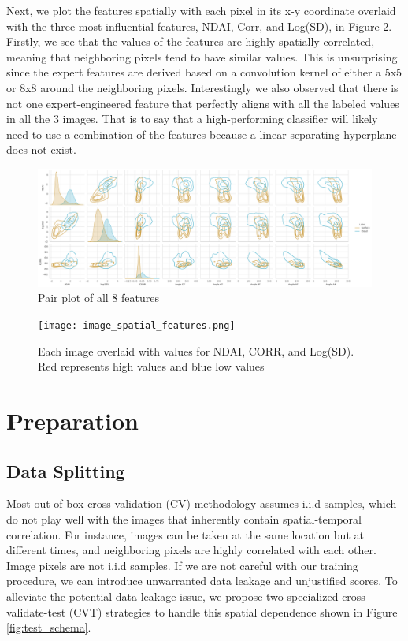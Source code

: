 \documentclass[11pt, letterpaper, journal]{IEEEtran}
\begin{document}
Next, we plot the features spatially with each pixel in its x-y coordinate overlaid with the three most influential features, NDAI, Corr, and Log(SD), in Figure \ref{fig:spatial_dist_covariates}. Firstly, we see that the values of the features are highly spatially correlated, meaning that neighboring pixels tend to have similar values. This is unsurprising since the expert features are derived based on a convolution kernel of either a 5x5 or 8x8 around the neighboring pixels. Interestingly we also observed that there is not one expert-engineered feature that perfectly aligns with all the labeled values in all the 3 images. That is to say that a high-performing classifier will likely need to use a combination of the features because a linear separating hyperplane does not exist.

\begin{figure}[!h]
\centering
\includegraphics[width=1.04\textwidth]{2.c.png}
\caption{Pair plot of all 8 features}
\label{fig:covariate_pairplot}
\end{figure}

\begin{figure}[!h]
\centering
\texttt{[image: image\_spatial\_features.png]}
\caption{Each image overlaid with values for NDAI, CORR, and Log(SD). Red represents high values and blue low values}
\label{fig:spatial_dist_covariates}
\end{figure}


\section{Preparation}

\subsection{Data Splitting}
Most out-of-box cross-validation (CV) methodology assumes i.i.d samples, which do not play well with the images that inherently contain spatial-temporal correlation. For instance, images can be taken at the same location but at different times, and neighboring pixels are highly correlated with each other. Image pixels are not i.i.d samples. If we are not careful with our training procedure, we can introduce unwarranted data leakage and unjustified scores. To alleviate the potential data leakage issue, we propose two specialized cross-validate-test (CVT) strategies to handle this spatial dependence shown in Figure \ref{fig:test_schema}.
\end{document}
